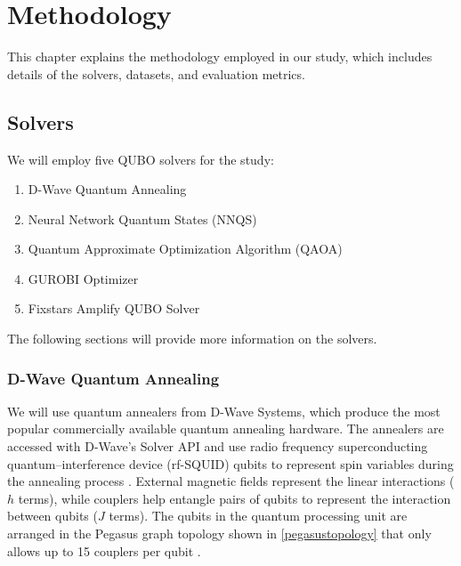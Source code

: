 
\chapter{Methodology}
\label{methodology}
This chapter explains the methodology employed in our study, which includes details of the solvers, datasets, and evaluation metrics.

\section{Solvers}
We will employ five QUBO solvers for the study:
\begin{enumerate}
    \item D-Wave Quantum Annealing
    \item Neural Network Quantum States (NNQS)
    \item Quantum Approximate Optimization Algorithm (QAOA)
    \item GUROBI Optimizer
    \item Fixstars Amplify QUBO Solver
\end{enumerate}
The following sections will provide more information on the solvers.

\subsection{D-Wave Quantum Annealing}
We will use quantum annealers from D-Wave Systems, which produce the most popular commercially available quantum annealing hardware. The annealers are accessed with D-Wave's Solver API and use radio frequency superconducting quantum–interference device (rf-SQUID) qubits to represent spin variables during the annealing process \cite{b14}. External magnetic fields represent the linear interactions ($h$ terms), while couplers help entangle pairs of qubits to represent the interaction between qubits ($J$ terms). The qubits in the quantum processing unit are arranged in the Pegasus graph topology shown in \autoref{pegasustopology} that only allows up to 15 couplers per qubit \cite{b14}. 


